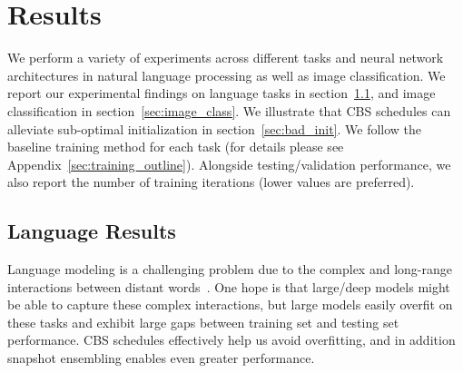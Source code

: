 \section{Results}
We perform a variety of experiments across different tasks and neural network architectures in natural language processing as well as image classification. We report our experimental findings on language tasks in section~\ref{sec:NLP}, and image classification
in section~\ref{sec:image_class}. We illustrate that CBS schedules can alleviate sub-optimal initialization in section~\ref{sec:bad_init}. We follow the baseline training method for each task (for details please see Appendix~\ref{sec:training_outline}). 
Alongside testing/validation performance, we also report the number of training iterations (lower values are preferred).

\subsection{Language Results}\label{sec:NLP}

Language modeling is a challenging problem due to the complex and long-range interactions between distant words~\cite{merity2016pointer}.
One hope is that large/deep models might be able to 
capture these complex interactions, but large models easily overfit on these tasks and exhibit large gaps between training set and testing set performance. 
CBS schedules effectively help us avoid overfitting, and in addition snapshot ensembling enables even greater performance.

